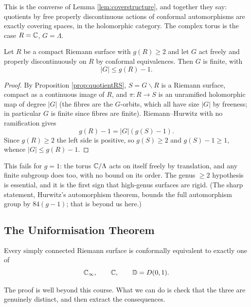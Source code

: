 \documentclass[a4paper]{scrartcl}
\newcommand{\Cinf}{\C_\infty}
\newcommand{\disc}{\mathbb{D}}
\begin{document}
This is the converse of Lemma \ref{lem:coverstructure}, and together they say: quotients
by free properly discontinuous actions of conformal automorphisms are exactly covering
spaces, in the holomorphic category. The complex torus is the case $R = \mathbb{C}$,
$G = \Lambda$.

\begin{theorem}\label{thm:hurwitzbound}
	Let $R$ be a compact Riemann surface with $g(R) \geq 2$ and let $G$ act freely and
	properly discontinuously on $R$ by conformal equivalences. Then $G$ is finite, with
	$$
	|G| \leq g(R) - 1.
	$$
\end{theorem}

\begin{proof}
	By Proposition \ref{prop:quotientRS}, $S = G\backslash R$ is a Riemann surface, compact
	as a continuous image of $R$, and $\pi : R \to S$ is an unramified holomorphic map of
	degree $|G|$ (the fibres are the $G$-orbits, which all have size $|G|$ by freeness; in
	particular $G$ is finite since fibres are finite). Riemann--Hurwitz with no ramification
	gives
	$$
	g(R) - 1 = |G|\left(g(S)-1\right).
	$$
	Since $g(R)\geq 2$ the left side is positive, so $g(S)\geq 2$ and $g(S)-1\geq1$, whence
	$|G| \leq g(R)-1$.
\end{proof}

\begin{remark}
	This fails for $g = 1$: the torus $\mathbb{C}/\Lambda$ acts on itself freely by translation, and
	any finite subgroup does too, with no bound on its order. The genus $\geq 2$ hypothesis
	is essential, and it is the first sign that high-genus surfaces are rigid. (The sharp
	statement, Hurwitz's automorphism theorem, bounds the full automorphism group by
	$84(g-1)$; that is beyond us here.)
\end{remark}

\subsection{The Uniformisation Theorem}

\begin{theorem}\label{thm:uniformisation}
	Every simply connected Riemann surface is conformally equivalent to exactly one of
	$$
	\Cinf, \qquad \C, \qquad \disc = D(0,1).
	$$
\end{theorem}

The proof is well beyond this course. What we can do is check that the three are genuinely
distinct, and then extract the consequences.
\end{document}
